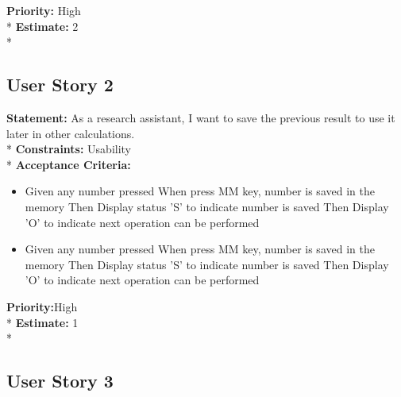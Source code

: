 \documentclass{article}
\begin{document}
\noindent \textbf {Priority:} High\\*
\newline
\noindent \textbf {Estimate:} 2\\*
\newline


\pagebreak
\subsection{User Story 2} %

\noindent \textbf {Statement: }As a research assistant, I want to save the previous result to use it later in other calculations. \\*
\newline 
\noindent \textbf {Constraints:}  Usability\\*
\newline
\textbf{Acceptance Criteria: } 
\begin{itemize}
  \item Given any number pressed
  \newline When press MM key, number is saved in the memory
  \newline Then Display status 'S' to indicate number is saved
  \newline Then Display 'O' to indicate next operation can be performed
  
  \item Given any number pressed
  \newline When press MM key, number is saved in the memory
  \newline Then Display status 'S' to indicate number is saved
  \newline Then Display 'O' to indicate next operation can be performed\newline
\end{itemize}

\noindent \textbf {Priority:}High\\*
\newline
\noindent \textbf {Estimate:} 1\\*
\newline

\subsection{User Story 3} %
\end{document}
